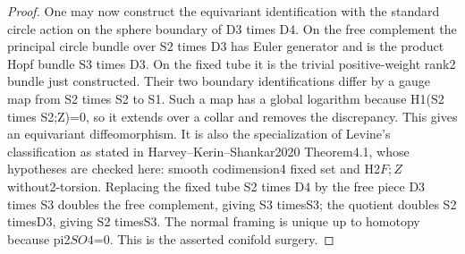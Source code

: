 \begin{proof}
One may now construct the equivariant identification with the standard circle action on the sphere boundary of D3 times D4. On the free complement the principal circle bundle over S2 times D3 has Euler generator and is the product Hopf bundle S3 times D3. On the fixed tube it is the trivial positive-weight rank2 bundle just constructed. Their two boundary identifications differ by a gauge map from S2 times S2 to S1. Such a map has a global logarithm because H1(S2 times S2;Z)=0, so it extends over a collar and removes the discrepancy. This gives an equivariant diffeomorphism. It is also the specialization of Levine's classification as stated in Harvey--Kerin--Shankar2020 Theorem4.1, whose hypotheses are checked here: smooth codimension4 fixed set and H2\(F;Z\) without2-torsion. Replacing the fixed tube S2 times D4 by the free piece D3 times S3 doubles the free complement, giving S3 timesS3; the quotient doubles S2 timesD3, giving S2 timesS3. The normal framing is unique up to homotopy because pi2\(SO4\)=0. This is the asserted conifold surgery.
\end{proof}
